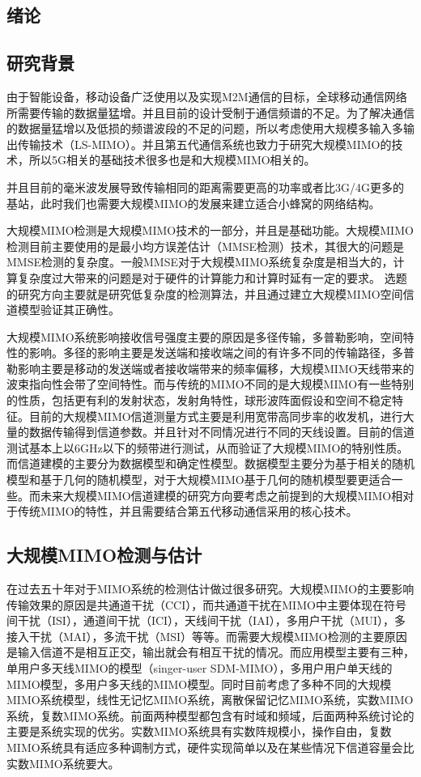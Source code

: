 \documentclass[bachelor,nocolorlinks, printoneside]{seuthesis} %
\begin{document}
\begin{Main} %

\chapter{绪论}
\section{研究背景}
由于智能设备，移动设备广泛使用以及实现M2M通信的目标，全球移动通信网络所需要传输的数据量猛增。并且目前的设计受制于通信频谱的不足。为了解决通信的数据量猛增以及低损的频谱波段的不足的问题，所以考虑使用大规模多输入多输出传输技术（LS-MIMO）。并且第五代通信系统也致力于研究大规模MIMO的技术，所以5G相关的基础技术很多也是和大规模MIMO相关的。

并且目前的毫米波发展导致传输相同的距离需要更高的功率或者比3G/4G更多的基站，此时我们也需要大规模MIMO的发展来建立适合小蜂窝的网络结构。

大规模MIMO检测是大规模MIMO技术的一部分，并且是基础功能。大规模MIMO检测目前主要使用的是最小均方误差估计（MMSE检测）技术，其很大的问题是MMSE检测的复杂度。一般MMSE对于大规模MIMO系统复杂度是相当大的，计算复杂度过大带来的问题是对于硬件的计算能力和计算时延有一定的要求。
选题的研究方向主要就是研究低复杂度的检测算法，并且通过建立大规模MIMO空间信道模型验证其正确性。

大规模MIMO系统影响接收信号强度主要的原因是多径传输，多普勒影响，空间特性的影响。多径的影响主要是发送端和接收端之间的有许多不同的传输路径，多普勒影响主要是移动的发送端或者接收端带来的频率偏移，大规模MIMO天线带来的波束指向性会带了空间特性。而与传统的MIMO不同的是大规模MIMO有一些特别的性质，包括更有利的发射状态，发射角特性，球形波阵面假设和空间不稳定特征。目前的大规模MIMO信道测量方式主要是利用宽带高同步率的收发机，进行大量的数据传输得到信道参数。并且针对不同情况进行不同的天线设置。目前的信道测试基本上以6GHz以下的频带进行测试，从而验证了大规模MIMO的特别性质。而信道建模的主要分为数据模型和确定性模型。数据模型主要分为基于相关的随机模型和基于几何的随机模型，对于大规模MIMO基于几何的随机模型要更适合一些。而未来大规模MIMO信道建模的研究方向要考虑之前提到的大规模MIMO相对于传统MIMO的特性，并且需要结合第五代移动通信采用的核心技术。

\section{大规模MIMO检测与估计}
在过去五十年对于MIMO系统的检测估计做过很多研究。大规模MIMO的主要影响传输效果的原因是共通道干扰（CCI），而共通道干扰在MIMO中主要体现在符号间干扰（ISI），通道间干扰（ICI），天线间干扰（IAI），多用户干扰（MUI），多接入干扰（MAI），多流干扰（MSI）等等。而需要大规模MIMO检测的主要原因是输入信道不是相互正交，输出就会有相互干扰的情况。而应用模型主要有三种，单用户多天线MIMO的模型（singer-user SDM-MIMO），多用户用户单天线的MIMO模型，多用户多天线的MIMO模型。同时目前考虑了多种不同的大规模MIMO系统模型，线性无记忆MIMO系统，离散保留记忆MIMO系统，实数MIMO系统，复数MIMO系统。前面两种模型都包含有时域和频域，后面两种系统讨论的主要是系统实现的优劣。实数MIMO系统具有实数阵规模小，操作自由，复数MIMO系统具有适应多种调制方式，硬件实现简单以及在某些情况下信道容量会比实数MIMO系统要大。


\end{Main}
\end{document}
